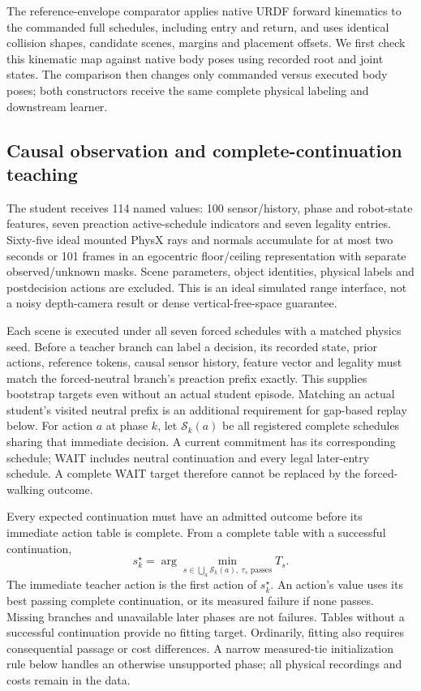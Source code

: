 \documentclass[10pt]{article}
\begin{document}
The reference-envelope comparator applies native URDF forward kinematics to
the commanded full schedules, including entry and return, and uses identical
collision shapes, candidate scenes, margins and placement offsets. We first
check this kinematic map against native body poses using recorded root and joint
states. The comparison then changes only commanded versus executed body poses;
both constructors receive the same complete physical labeling and downstream
learner.

\subsection{Causal observation and complete-continuation teaching}
The student receives 114 named values: 100 sensor/history, phase and robot-state
features, seven preaction active-schedule indicators and seven legality entries.
Sixty-five ideal mounted PhysX rays and normals accumulate for at most two
seconds or 101 frames in an egocentric floor/ceiling representation with separate
observed/unknown masks. Scene parameters, object identities, physical labels and
postdecision actions are excluded. This is an ideal simulated range interface,
not a noisy depth-camera result or dense vertical-free-space guarantee.

Each scene is executed under all seven forced schedules with a matched physics
seed. Before a teacher branch can label a decision, its recorded state, prior
actions, reference tokens, causal sensor history, feature vector and legality
must match the forced-neutral branch's preaction prefix exactly. This supplies
bootstrap targets even without an actual student episode. Matching an actual
student's visited neutral prefix is an additional requirement for gap-based
replay below. For action $a$ at phase $k$, let $\mathcal S_k(a)$ be all registered
complete schedules sharing
that immediate decision. A current commitment has its corresponding schedule;
WAIT includes neutral continuation and every legal later-entry schedule. A
complete WAIT target therefore cannot be replaced by the forced-walking outcome.

Every expected continuation must have an admitted outcome before its immediate
action table is complete. From a complete table with a successful continuation,
\begin{equation}
 s_k^\star=\arg\min_{s\in\bigcup_a\mathcal S_k(a),\ \tau_s\text{ passes}}T_s.
\end{equation}
The immediate teacher action is the first action of $s_k^\star$. An action's value
uses its best passing complete continuation, or its measured failure if none
passes. Missing branches and unavailable later phases are not failures. Tables
without a successful continuation provide no fitting target. Ordinarily, fitting
also requires consequential passage or cost differences. A narrow measured-tie
initialization rule below handles an otherwise unsupported phase; all physical
recordings and costs remain in the data.
\end{document}
